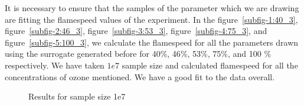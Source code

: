\bigskip

 It is necessary to ensure that the samples of the parameter which we are drawing are fitting the flamespeed values of the experiment. In the figure~\ref{subfig-1:40_3}, figure~\ref{subfig-2:46_3}, figure~\ref{subfig-3:53_3}, figure~\ref{subfig-4:75_3}, and figure~\ref{subfig-5:100_3},   we calculate the flamespeed for all the parameters drawn using the surrogate generated before for 40$\%$, 46$\%$, 53$\%$, 75$\%$, and 100 $\%$ respectively. We have taken $1e7$ sample size and calculated flamespeed for all the concentrations of ozone mentioned. We have a good fit to the data overall.




\begin{figure}[H]
    \caption{Results for sample size 1e7}
\end{figure}

